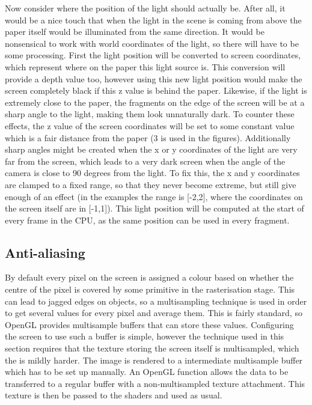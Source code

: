 \documentclass[a4paper, 12pt]{article}
\begin{document}
Now consider where the position of the light should actually be. After all, it would be a nice touch that when the light in the scene is coming from above the paper itself would be illuminated from the same direction. It would be nonsensical to work with world coordinates of the light, so there will have to be some processing. First the light position will be converted to screen coordinates, which represent where on the paper this light source is. This conversion will provide a depth value too, however using this new light position would make the screen completely black if this z value is behind the paper. Likewise, if the light is extremely close to the paper, the fragments on the edge of the screen will be at a sharp angle to the light, making them look unnaturally dark. To counter these effects, the z value of the screen coordinates will be set to some constant value which is a fair distance from the paper (3 is used in the figures). Additionally sharp angles might be created when the x or y coordinates of the light are very far from the screen, which leads to a very dark screen when the angle of the camera is close to 90 degrees from the light. To fix this, the x and y coordinates are clamped to a fixed range, so that they never become extreme, but still give enough of an effect (in the examples the range is [-2,2], where the coordinates on the screen itself are in [-1,1]). This light position will be computed at the start of every frame in the CPU, as the same position can be used in every fragment.


\subsection{Anti-aliasing}
By default every pixel on the screen is assigned a colour based on whether the centre of the pixel is covered by some primitive in the rasterisation stage. This can lead to jagged edges on objects, so a multisampling technique is used in order to get several values for every pixel and average them. This is fairly standard, so OpenGL provides multisample buffers that can store these values. Configuring the screen to use such a buffer is simple, however the technique used in this section requires that the texture storing the screen itself is multisampled, which the is mildly harder. The image is rendered to a intermediate multisample buffer which has to be set up manually. An OpenGL function allows the data to be transferred to a regular buffer with a non-multisampled texture attachment. This texture is then be passed to the shaders and used as usual.
\end{document}
